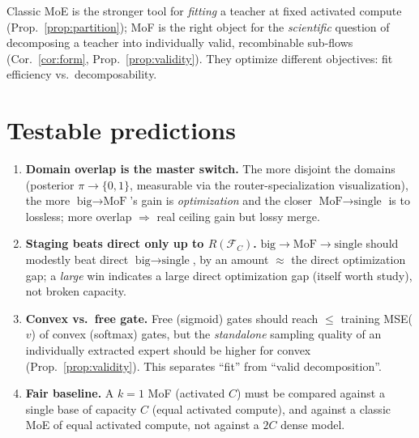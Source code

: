 \documentclass[11pt,a4paper]{article}
\newcommand{\Fc}{\mathcal{F}_C}
\begin{document}
\noindent Classic MoE is the stronger tool for \emph{fitting} a teacher at fixed activated compute
(Prop.~\ref{prop:partition}); MoF is the right object for the \emph{scientific} question of decomposing
a teacher into individually valid, recombinable sub-flows (Cor.~\ref{cor:form},
Prop.~\ref{prop:validity}). They optimize different objectives: fit efficiency vs.\ decomposability.

\section{Testable predictions}
\begin{enumerate}[leftmargin=1.4em]
  \item \textbf{Domain overlap is the master switch.} The more disjoint the domains (posterior
  $\pi\!\to\!\{0,1\}$, measurable via the router-specialization visualization), the more
  $\text{big}\!\to\!\text{MoF}$'s gain is \emph{optimization} and the closer
  $\text{MoF}\!\to\!\text{single}$ is to lossless; more overlap $\Rightarrow$ real ceiling gain but lossy
  merge.
  \item \textbf{Staging beats direct only up to $R(\Fc)$.} $\text{big}\!\to\!\text{MoF}\!\to\!\text{single}$
  should modestly beat direct $\text{big}\!\to\!\text{single}$, by an amount $\approx$ the direct
  optimization gap; a \emph{large} win indicates a large direct optimization gap (itself worth study),
  not broken capacity.
  \item \textbf{Convex vs.\ free gate.} Free (sigmoid) gates should reach $\le$ training MSE($v$) of
  convex (softmax) gates, but the \emph{standalone} sampling quality of an individually extracted
  expert should be higher for convex (Prop.~\ref{prop:validity}). This separates ``fit'' from
  ``valid decomposition''.
  \item \textbf{Fair baseline.} A $k{=}1$ MoF (activated $C$) must be compared against a single base of
  capacity $C$ (equal activated compute), and against a classic MoE of equal activated compute, not
  against a $2C$ dense model.
\end{enumerate}
\end{document}
